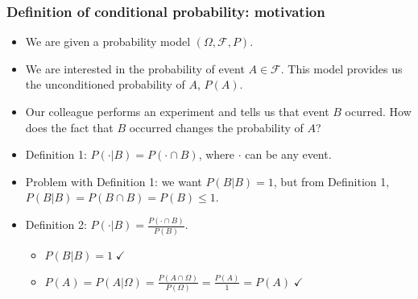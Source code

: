 \begin{frame}
    \frametitle{Definition of conditional probability: motivation}

    \begin{itemize}[<+->]
        \item We are given a probability model $(\Omega,\mathcal{F},P)$.
        \item We are interested in the probability of event $A\in\mathcal{F}$.
            This model provides us the unconditioned probability of $A$, $P(A)$.

		\item Our colleague performs an experiment and tells us that event $B$
ocurred. How does the fact that $B$ occurred changes the probability of $A$?

            \begin{figure}
            \end{figure}

		\item Definition 1: $P(\cdot|B)=P(\cdot\cap B)$, where $\cdot$ can be any event.

		\item Problem with Definition 1: we want $P(B|B)=1$, but from Definition 1, $P(B|B)=P(B\cap B)=P(B)\le 1$.

		\item Definition 2: $P(\cdot|B)=\frac{P(\cdot\cap B)}{P(B)}$.

			\begin{itemize}
				\item $P(B|B)=1\;\checkmark$
				\item $P(A)=P(A|\Omega)=\frac{P(A\cap\Omega)}{P(\Omega)}=\frac{P(A)}{1}=P(A)\;\checkmark$
			\end{itemize}

    \end{itemize}

\end{frame}


